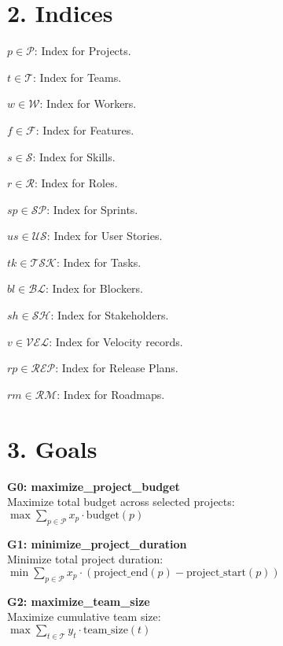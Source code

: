\documentclass[12pt]{article}
\begin{document}
\section{2. Indices}
\item $ p \in \mathcal{P} $: Index for Projects.
    \item $ t \in \mathcal{T} $: Index for Teams.
    \item $ w \in \mathcal{W} $: Index for Workers.
    \item $ f \in \mathcal{F} $: Index for Features.
    \item $ s \in \mathcal{S} $: Index for Skills.
    \item $ r \in \mathcal{R} $: Index for Roles.
    \item $ sp \in \mathcal{SP} $: Index for Sprints.
    \item $ us \in \mathcal{US} $: Index for User Stories.
    \item $ tk \in \mathcal{TSK} $: Index for Tasks.
    \item $ bl \in \mathcal{BL} $: Index for Blockers.
    \item $ sh \in \mathcal{SH} $: Index for Stakeholders.
    \item $ v \in \mathcal{VEL} $: Index for Velocity records.
    \item $ rp \in \mathcal{REP} $: Index for Release Plans.
    \item $ rm \in \mathcal{RM} $: Index for Roadmaps.

\section{3. Goals}
\item \textbf{G0: maximize\_project\_budget} \\
    Maximize total budget across selected projects: \\
    $ \max \sum_{p \in \mathcal{P}} x_p \cdot \text{budget}(p) $

    \item \textbf{G1: minimize\_project\_duration} \\
    Minimize total project duration: \\
    $ \min \sum_{p \in \mathcal{P}} x_p \cdot (\text{project\_end}(p) - \text{project\_start}(p)) $

    \item \textbf{G2: maximize\_team\_size} \\
    Maximize cumulative team size: \\
    $ \max \sum_{t \in \mathcal{T}} y_t \cdot \text{team\_size}(t) $
\end{document}
